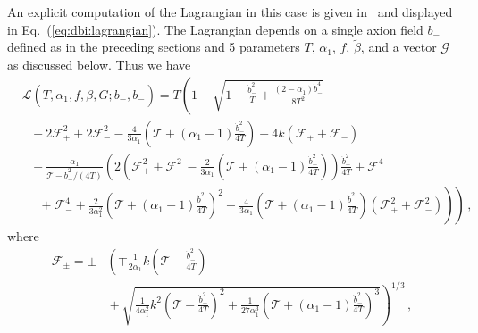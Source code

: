 \documentclass[12pt]{article}
\begin{document}
An explicit computation of the Lagrangian in this case is given in~\cite{Nath:2018xxe} and displayed in Eq.~(\ref{eq:dbi:lagrangian}).
The Lagrangian depends on a single axion field $b_-$ defined as in the preceding sections and 5 parameters $T$, $\alpha_1$, $f$, $\tilde\beta$, and a vector $\mathcal{G}$ as discussed below.
Thus we have
\begin{equation} \label{eq:dbi:lagrangian}
  \begin{aligned}
    &\mathcal{L}\left(T, \alpha_1, f, \beta, G; b_-, \dot{b_-}\right) = T \left(
        1
      - \sqrt{
          1
        - \frac{{\dot b}_-^2}{T}
        + \frac{\left(2 - \alpha_1\right) {\dot b}_-^4}{8 T^2}
      }\right.\\
      &~~~ \left.{}
      + 2 \mathcal{F}_+^2
      + 2 \mathcal{F}_-^2
      - \frac{4}{3 \alpha_1} \left(
        \mathcal{T} + \left(\alpha_1 - 1\right) \frac{{\dot b}_-^2}{4 T}
      \right)
      + 4 k \left(\mathcal{F}_+ + \mathcal{F}_-\right)\right.\\
      &~~~ \left.{}
      + \frac{\alpha_1}{\mathcal{T} - {\dot b}_-^2 / \left(4 T\right)}\left(
          2 \left(
              \mathcal{F}_+^2
            + \mathcal{F}_-^2
            - \frac{2}{3 \alpha_1}
              \left(\mathcal{T} + \left(\alpha_1 - 1\right) \frac{{\dot b}_-^2}{4 T}\right)
          \right) \frac{{\dot b}_-^2}{4 T}
        + \mathcal{F}_+^4\right.\right.\\
        &~~~~~~ \left.\left.{}
        + \mathcal{F}_-^4
        + \frac{2}{3 \alpha_1^2}
          \left(\mathcal{T} + \left(\alpha_1 - 1\right) \frac{{\dot b}_-^2}{4 T}\right)^2
        - \frac{4}{3 \alpha_1}
          \left(\mathcal{T} + \left(\alpha_1 - 1\right) \frac{{\dot b}_-^2}{4 T}\right)
          \left(\mathcal{F}_+^2 + \mathcal{F}_-^2\right)
      \right)
    \right)\,,
  \end{aligned}
\end{equation}
where
\begin{equation}
  \begin{aligned}
    \mathcal{F}_\pm = \pm &\left(
      \mp\frac{1}{2 \alpha_1} k \left(\mathcal{T} - \frac{{\dot b}_-^2}{4 T}\right)\right.\\
      &\left.{} + \sqrt{
          \frac{1}{4 \alpha_1^2} k^2 \left(\mathcal{T} - \frac{{\dot b}_-^2}{4 T}\right)^2
        + \frac{1}{27 \alpha_1^3} \left(
            \mathcal{T}
          + \left(\alpha_1 - 1\right) \frac{{\dot b}_-^2}{4 T}
        \right)^3
      }
    \right)^{1 / 3}\,,
  \end{aligned}
\end{equation}
\end{document}
